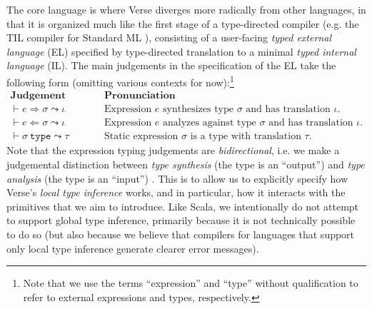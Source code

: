 The core language is where Verse diverges more radically from other languages, in that it is organized much like the first stage of a type-directed compiler (e.g. the TIL compiler for Standard ML \cite{tarditi+:til-OLD}), consisting of a user-facing \emph{typed external language} (EL) specified by type-directed translation to a minimal \emph{typed internal language} (IL). The main judgements in the specification of the EL take the following form  (omitting various contexts for now):\footnote{Note that we use the terms ``expression'' and ``type'' without qualification to refer to  external expressions and types, respectively. }
\\[1ex]
$\begin{array}{ll}
\textbf{Judgement Form} & \textbf{Pronunciation}\\
\vdash e \Rightarrow \sigma \leadsto \iota & \text{Expression $e$ synthesizes type $\sigma$ and has translation $\iota$.}\\
\vdash e \Leftarrow \sigma \leadsto \iota & \text{Expression $e$ analyzes against type $\sigma$ and has translation $\iota$.}\\
\vdash \sigma~\mathtt{type} \leadsto \tau & \text{Static expression $\sigma$ is a type with translation $\tau$.}
\end{array}
$\\[1ex]
Note that the expression typing judgements are \emph{bidirectional}, i.e. we make a judgemental distinction between \emph{type synthesis} (the type is an ``output'') and \emph{type analysis} (the type is an ``input'') \cite{Pierce:2000:LTI:345099.345100}. This is to  allow us to explicitly specify how Verse's \emph{local type inference} works, and in particular, how it interacts with the primitives that we aim to introduce. Like Scala, we intentionally do not attempt to support global type inference, primarily because it is not technically possible to do so (but also because we believe that compilers for languages that support only local type inference generate clearer error messages). 



